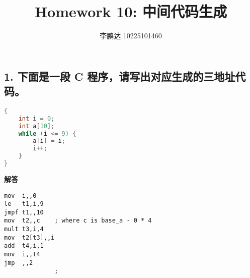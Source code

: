 \documentclass[a4paper, body={18cm,22cm}]{article}
\title{Homework 10: 中间代码生成}
\author{李鹏达 10225101460}
\date{}
\begin{document}
\maketitle

\subsection*{1. 下面是一段 C 程序，请写出对应生成的三地址代码。}

\begin{lstlisting}[language=C]
{
    int i = 0;
    int a[10];
    while (i <= 9) {
        a[i] = i;
        i++;
    }
}
\end{lstlisting}

\noindent\textbf{{\heiti 解答}}\\ 

\begin{lstlisting}
mov  i,,0
le   t1,i,9
jmpf t1,,10
mov  t2,,c    ; where c is base_a - 0 * 4
mult t3,i,4
mov  t2[t3],,i
add  t4,i,1
mov  i,,t4
jmp  ,,2
              ;
\end{lstlisting}
\end{document}
